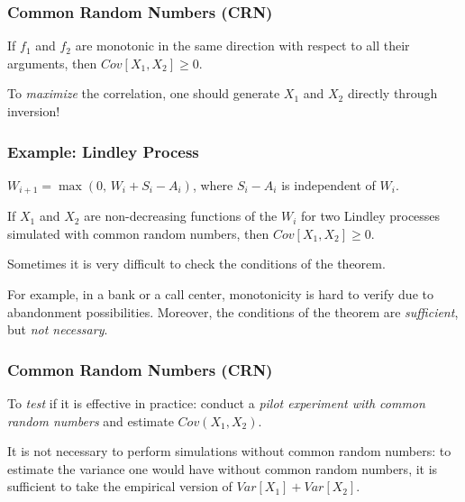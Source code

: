 \documentclass[t,usepdftitle=false]{beamer}
\begin{document}
\begin{frame}
	\frametitle{Common Random Numbers (CRN)}
	
	\begin{theorem}
		If $f_1$ and $f_2$ are monotonic in the same direction with respect to
		all their arguments, then  $Cov[X_1, X_2] \ge 0$.
	\end{theorem}
	
	\mbox{}
	
	To \emph{maximize} the correlation, one should generate
	$X_1$ and $X_2$ directly through inversion!
	
\end{frame}
\begin{frame}
	\frametitle{Example: Lindley Process}
	
	${W_{i+1}} = \max(0,\, W_i + S_i - A_i)$, where $S_i - A_i$ is
	independent of $W_i$.
	
	\mbox{}
	
	If ${X_1}$ and ${X_2}$ are non-decreasing functions of the $W_i$
	for two Lindley processes simulated with common random numbers,
	then $Cov[X_1, X_2] \ge 0$.
	
	\mbox{}
	
	Sometimes it is very difficult to check the conditions of the
	theorem.
	
	\mbox{}
	
	For example, in a bank or a call center, monotonicity
	is hard to verify due to abandonment possibilities.
	Moreover, the conditions of the theorem are \emph{sufficient}, but 
	\emph{not necessary}.
	
\end{frame}

\begin{frame}
	\frametitle{Common Random Numbers (CRN)}
	
	To \emph{test} if it is effective in practice:
	conduct a \emph{pilot experiment with common random numbers} and estimate 
	$Cov(X_1, X_2)$.
	
	\mbox{}
	
	It is not necessary to perform simulations without common random numbers:
	to estimate the variance one would have without common random numbers,
	it is sufficient to take the empirical version of $Var[X_1] + Var[X_2]$.
	
\end{frame}
\end{document}
